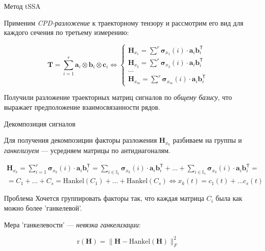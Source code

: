 	\begin{frame}{Метод tSSA}
		
		Применим \textit{CPD-разложение} к траекторному тензору и рассмотрим его вид для каждого сечения по третьему измерению:
		
		\begin{equation}\label{eq:tSSA_decomp}
			\textbf{T} = \sum\limits_{i = 1}^{r} \mathbf{a}_i \otimes \mathbf{b}_i \otimes \mathbf{c}_i \Leftrightarrow \begin{cases}
				\mathbf{H}_{x_1} = \sum\limits^{r} \boldsymbol{\sigma}_{x_1}(i) \cdot \mathbf{a}_i  \mathbf{b}_i^{\mathsf{T}}  \\
				\mathbf{H}_{x_2} = \sum\limits^{r} \boldsymbol{\sigma}_{x_2}(i) \cdot \mathbf{a}_i  \mathbf{b}_i^{\mathsf{T}} \\
				\ldots \\
				\mathbf{H}_{x_m} = \sum\limits^{r} \boldsymbol{\sigma}_{x_m}(i) \cdot \mathbf{a}_i  \mathbf{b}_i^{\mathsf{T}} 
			\end{cases}
		\end{equation}
		
		Получили разложение траекторных матриц сигналов по \emph{общему базису}, что выражает предположение взаимосвязанности рядов.
		
	\end{frame}
	
	\begin{frame}{Декомпозиция сигналов}
		
		Для получения декомпозиции факторы разложения $ \mathbf{H}_{x_k} $ разбиваем на группы и \emph{ганкелизуем} --- усредняем матрицы по антидиагоналям.
		
		\begin{multline*}\label{eq:decomp_method_ideal}
			\mathbf{H}_{x_k} = \sum\limits_{i = 1}^{r} \boldsymbol{\sigma}_{x_k}(i) \cdot \mathbf{a}_i  \mathbf{b}_i^{\mathsf{T}} = \sum\limits_{i \in \mathbb{I}_1} \boldsymbol{\sigma}_{x_k}(i) \cdot \mathbf{a}_i  \mathbf{b}_i^{\mathsf{T}} + \ldots + \sum\limits_{i \in \mathbb{I}_s} \boldsymbol{\sigma}_{x_k}(i) \cdot \mathbf{a}_i  \mathbf{b}_i^{\mathsf{T}} = \\ = C_1 + \ldots + C_s = \text{Hankel}(C_1) + \ldots + \text{Hankel}(C_s)  \Leftrightarrow x_k(t) = c_1(t) + \ldots c_s(t)
		\end{multline*}
		
		\begin{alertblock}{Проблема}
			Хочется группировать факторы так, что каждая матрица $ C_i $ была как можно более 'ганкелевой'.
			
			Мера 'ганкелевости' --- \emph{невязка ганкелизации}:
			
			\[
				\text{r}(\mathbf{H}) = \lVert \mathbf{H} - \text{Hankel}(\mathbf{H}) \rVert_{F}^2
			\]
		\end{alertblock}
		
	\end{frame}
	

